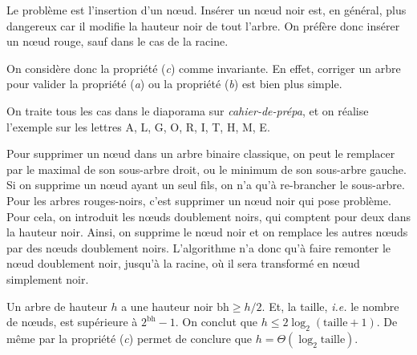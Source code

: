 \documentclass[a4paper]{article}
\begin{document}
	Le problème est l'insertion d'un nœud.
	Insérer un nœud noir est, en général, plus dangereux car il modifie la hauteur noir de tout l'arbre.
	On préfère donc insérer un nœud rouge, sauf dans le cas de la racine.

	On considère donc la propriété (\textit{c}) comme invariante. En effet, corriger un arbre pour valider la propriété (\textit{a}) ou la propriété (\textit{b}) est bien plus simple.

	On traite tous les cas dans le diaporama sur \textit{cahier-de-prépa}, et on réalise l'exemple sur les lettres A, L, G, O, R, I, T, H, M, E.

	\bigskip
	
	Pour supprimer un nœud dans un arbre binaire classique, on peut le remplacer par le maximal de son sous-arbre droit, ou le minimum de son sous-arbre gauche. Si on supprime un nœud ayant un seul fils, on n'a qu'à re-brancher le sous-arbre.
	Pour les arbres rouges-noirs, c'est supprimer un nœud noir qui pose problème.
	Pour cela, on introduit les nœuds doublement noirs, qui comptent pour deux dans la hauteur noir.
	Ainsi, on supprime le nœud noir et on remplace les autres nœuds par des nœuds doublement noirs.
	L'algorithme n'a donc qu'à faire remonter le nœud doublement noir, jusqu'à la racine, où il sera transformé en nœud simplement noir.

	Un arbre de hauteur $h$ a une hauteur noir $\mathrm{bh} \ge h / 2$. Et, la taille, \textit{i.e.} le nombre de nœuds, est supérieure à $2^{\mathrm{bh}} - 1$.
	On conclut que $h \le 2 \log_2(\mathrm{taille} + 1)$.
	De même par la propriété (\textit{c}) permet de conclure que $h = \Theta(\log_2 \mathrm{taille})$.
\end{document}
